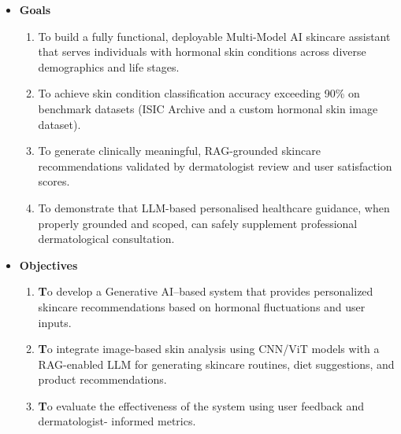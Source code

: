 \begin{itemize}
    \item {\fontsize{14}{16}\selectfont \textbf{Goals}}
    \vspace{0.5cm}
        \begin{enumerate}
            \item To build a fully functional, deployable Multi-Model AI skincare assistant that serves individuals with hormonal skin conditions across diverse demographics and life stages.

            \item To achieve skin condition classification accuracy exceeding 90\% on benchmark datasets (ISIC Archive and a custom hormonal skin image dataset).

            \item To generate clinically meaningful, RAG-grounded skincare recommendations validated by dermatologist review and user satisfaction scores.

            \item To demonstrate that LLM-based personalised healthcare guidance, when properly grounded and scoped, can safely supplement professional dermatological consultation.
        \end{enumerate}
        \vspace{1cm}
     \newpage
\vspace{1cm}   %

\item {\fontsize{14}{16}\selectfont \textbf{Objectives}}
\vspace{0.5cm}

\begin{enumerate}
        \item \textbf To develop a Generative AI–based system that provides personalized skincare recommendations  based on  hormonal  fluctuations and user inputs.​

        \item \textbf To integrate image-based skin analysis using CNN/ViT models with a RAG-enabled LLM   for generating skincare routines, diet suggestions, and product recommendations.​
        
        \item \textbf To evaluate the effectiveness of the system using user feedback and dermatologist- informed metrics.​

    \end{enumerate}
    \vspace{0.5cm}
\end{itemize}

